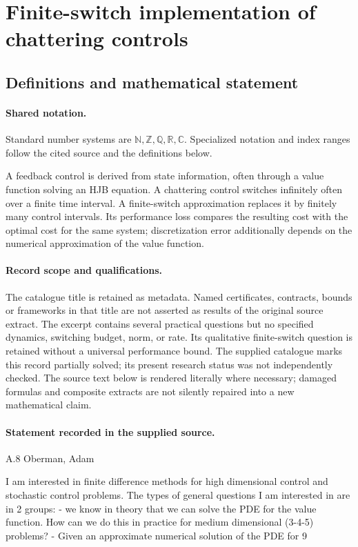 \documentclass[11pt]{article}
\begin{document}
\section{Finite-switch implementation of chattering controls}\label{statement}

\subsection{Definitions and mathematical statement}

\paragraph{Shared notation.}Standard number systems are $\mathbb N,\mathbb Z,\mathbb Q,\mathbb R,\mathbb C$. Specialized notation and index ranges follow the cited source and the definitions below.


A feedback control is derived from state information, often through a value function solving an HJB equation. A chattering control switches infinitely often over a finite time interval. A finite-switch approximation replaces it by finitely many control intervals. Its performance loss compares the resulting cost with the optimal cost for the same system; discretization error additionally depends on the numerical approximation of the value function.
\paragraph{Record scope and qualifications.}
The catalogue title is retained as metadata. Named certificates, contracts, bounds or frameworks in that title are not asserted as results of the original source extract.
The excerpt contains several practical questions but no specified dynamics, switching budget, norm, or rate. Its qualitative finite-switch question is retained without a universal performance bound. The supplied catalogue marks this record partially solved; its present research status was not independently checked.
The source text below is rendered literally where necessary; damaged formulas and composite extracts are not silently repaired into a new mathematical claim.
\paragraph{Statement recorded in the supplied source.}
A.8 Oberman, Adam

I am interested in finite difference methods for high dimensional control and stochastic control problems. The types of general questions I am interested in are in 2 groups: - we know in theory that we can solve the PDE for the value function. How can we do this in practice for medium dimensional (3-4-5) problems? - Given an approximate numerical solution of the PDE for 9
\end{document}
